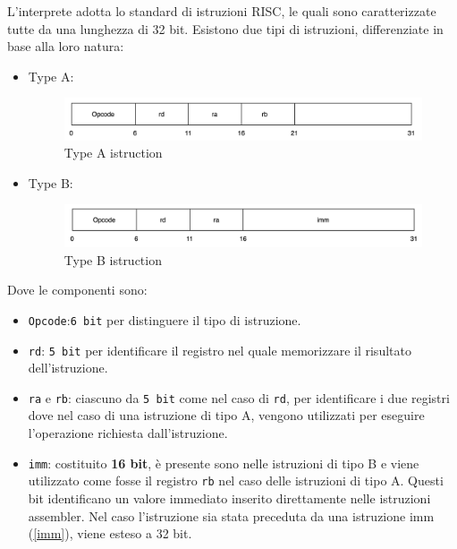 \vspace{0.2cm}

\noindent L'interprete adotta lo standard di istruzioni RISC, le quali sono caratterizzate tutte da una lunghezza di 32 bit. Esistono due tipi di istruzioni, differenziate in base alla loro natura:

\begin{itemize}
    \item Type A:  
    \begin{figure}[h!]
    \centering
    \includegraphics[scale=0.35]{images/Capitolo4/1_im.png}
    \caption{Type A istruction}
    \label{typeA}
    \end{figure}

    \item Type B:
    \begin{figure}[h!]
    \centering
    \includegraphics[scale=0.35]{images/Capitolo4/2_im.png}
    \caption{Type B istruction}
    \label{typeB}
    \end{figure}
\end{itemize}

\noindent Dove le componenti sono:

\begin{itemize}
    \item \texttt{Opcode}:\texttt{6 bit} per distinguere il tipo di istruzione.
    \item \texttt{rd}: \texttt{5 bit} per identificare il registro nel quale memorizzare il risultato dell'istruzione.
    \item \texttt{ra} e \texttt{rb}: ciascuno da \texttt{5 bit} come nel caso di \texttt{rd}, per identificare i due registri dove nel caso di una istruzione di tipo A, vengono utilizzati per eseguire l'operazione richiesta dall'istruzione. 
    \item \texttt{imm}: costituito \textbf{16 bit}, è presente sono nelle istruzioni di tipo B e viene utilizzato come fosse il registro \texttt{rb} nel caso delle istruzioni di tipo A. Questi bit identificano un valore immediato inserito direttamente nelle istruzioni assembler. Nel caso l'istruzione sia stata preceduta da una istruzione imm (\ref{imm}), viene esteso a 32 bit.
\end{itemize}


